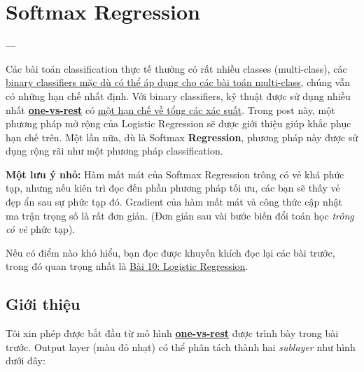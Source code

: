 \chapter{Softmax Regression}
--- 
 
 
 
Các bài toán classification thực tế thường có rất nhiều classes (multi-class), các \href{http://machinelearningcoban.com/2017/02/11/binaryclassifiers/#-binary-classifiers-cho-multi-class-classification-problems}{binary classifiers mặc dù có thể áp dụng cho các bài toán multi-class}, chúng vẫn có những hạn chế nhất định. Với binary classifiers, kỹ thuật được sử dụng nhiều nhất \href{http://machinelearningcoban.com/2017/02/11/binaryclassifiers/#one-vs-rest-hay-one-hot-coding}{\textbf{one-vs-rest}} có \href{http://machinelearningcoban.com/2017/02/11/binaryclassifiers/#han-che-cua-one-vs-rest}{một hạn chế về tổng các xác suất}. Trong post này, một phương pháp mở rộng của Logistic Regression sẽ được giới thiệu giúp khắc phục hạn chế trên. Một lần nữa, dù là Softmax \textbf{Regression}, phương pháp này được sử dụng rộng rãi như một phương pháp classification.  
 
 
  
\textbf{Một lưu ý nhỏ:} Hàm mất mát của Softmax Regression trông có vẻ khá phức tạp, nhưng nếu  kiên trì đọc đến phần phương pháp tối ưu, các bạn sẽ thấy vẻ đẹp ẩn sau sự phức tạp đó. Gradient của hàm mất mát và công thức cập nhật ma trận trọng số là rất đơn giản. (Đơn giản sau vài bước biến đổi toán học \textit{trông có vẻ} phức tạp). 
 
Nếu có điểm nào khó hiểu, bạn đọc được khuyến khích đọc lại các bài trước, trong đó quan trọng nhất là \href{http://machinelearningcoban.com/2017/01/27/logisticregression/}{Bài 10: Logistic Regression}. 
 
\section{Giới thiệu }
Tôi xin phép được bắt đầu từ mô hình \href{http://machinelearningcoban.com/2017/02/11/binaryclassifiers/#one-vs-rest-hay-one-hot-coding}{\textbf{one-vs-rest}} được trình bày trong bài trước. Output layer (màu đỏ nhạt) có thể phân tách thành hai \textit{sublayer} như hình dưới đây: 
 
 
